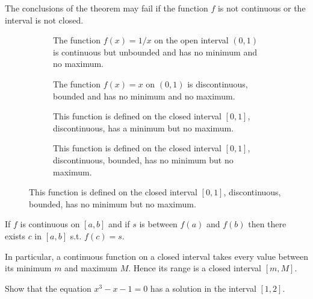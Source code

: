 \documentclass[../main.tex]{subfiles}
\begin{document}
\begin{example}
    The conclusions of the theorem may fail if the function $f$ is not continuous or the interval is not closed.

    \begin{figure}[H]
      \centering
      \begin{subfigure}[t]{0.2\textwidth}
        
        \caption{The function $f(x) = 1/x$ on the open interval $(0,1)$ is continuous but unbounded and has no minimum and no maximum.}
      \end{subfigure}
      \quad
      \begin{subfigure}[t]{0.2\textwidth}
        
        \caption{The function $f(x) = x$ on $(0,1)$ is discontinuous, bounded and has no minimum and no maximum.}
      \end{subfigure}
      \quad
      \begin{subfigure}[t]{0.2\textwidth}
        
        \caption{This function is defined on the closed interval $[0,1]$, discontinuous, has a minimum but no maximum.}
      \end{subfigure}
      \quad
      \begin{subfigure}[t]{0.2\textwidth}
        
        \caption{This function is defined on the closed interval $[0,1]$, discontinuous, bounded, has no minimum but no maximum.}
      \end{subfigure}
    \end{figure}
\end{example}

\begin{theorem}
    If $f$ is continuous on $[a, b]$ and if $s$ is between $f(a)$ and $f(b)$ then there exists $c$ in $[a, b]$ s.t. $f(c) = s$.
\end{theorem}

\begin{figure}[H]
    \centering
    
\end{figure}

In particular, a continuous function on a closed interval takes every value between its minimum $m$ and maximum $M$. Hence its range is a closed interval $[m, M]$.
\begin{example}
    Show that the equation $x^3 - x - 1 = 0$ has a solution in the interval $[1, 2]$.
\end{example}
\end{document}
